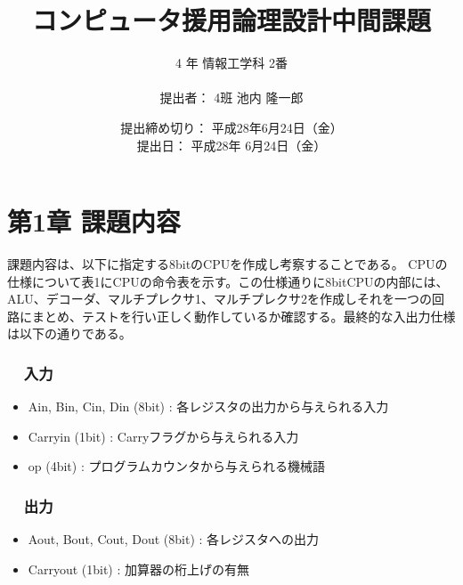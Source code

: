 \documentclass[12pt]{jreport}
\title{コンピュータ援用論理設計中間課題 \vspace{5cm}}
\author{\hspace{10cm} 4 年 情報工学科 2番 \\\\\hspace{9cm} 提出者： 4班 池内 隆一郎}
\date{\vspace{5cm}\hspace{-10cm}提出締め切り： 平成28年6月24日（金）\\\hspace{-115mm} 提出日： 平成28年 6月24日（金）\\\hspace{-143mm}}
\begin{document}
    
    \maketitle
    \newpage

    \chapter*{第1章 課題内容}
         課題内容は、以下に指定する8bitのCPUを作成し考察することである。 CPUの仕様について表1にCPUの命令表を示す。この仕様通りに8bitCPUの内部には、ALU、デコーダ、マルチプレクサ1、マルチプレクサ2を作成しそれを一つの回路にまとめ、テストを行い正しく動作しているか確認する。最終的な入出力仕様は以下の通りである。
         
         \subsection*{\ \ 入力}
            \begin{itemize}
                \item Ain, Bin, Cin, Din (8bit) : 各レジスタの出力から与えられる入力
                \item Carryin (1bit) : Carryフラグから与えられる入力
                \item op (4bit) : プログラムカウンタから与えられる機械語
            \end{itemize}
         \subsection*{\ \ 出力}
            \begin{itemize}
                \item Aout, Bout, Cout, Dout (8bit) : 各レジスタへの出力
                \item Carryout (1bit) : 加算器の桁上げの有無
            \end{itemize}
\end{document}

